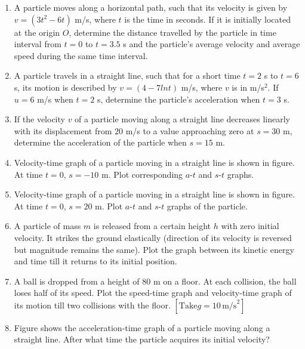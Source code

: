 \documentclass{article}
\begin{document}
\begin{enumerate}
\item A particle moves along a horizontal path, such that its velocity is given by \( v = (3t^2 - 6t) \) m/s, where \( t \) is the time in seconds. If it is initially located at the origin \( O \), determine the distance travelled by the particle in time interval from \( t = 0 \) to \( t = 3.5 \) s and the particle’s average velocity and average speed during the same time interval.

\item A particle travels in a straight line, such that for a short time \( t = 2 \) s to \( t = 6 \) s, its motion is described by \( v = (4 - 7 ln t) \) m/s, where \( v \) is in m/s\(^2\). If \( u = 6 \) m/s when \( t = 2 \) s, determine the particle’s acceleration when \( t = 3 \) s.

\item If the velocity \( v \) of a particle moving along a straight line decreases linearly with its displacement from \( 20 \) m/s to a value approaching zero at \( s = 30 \) m, determine the acceleration of the particle when \( s = 15 \) m.

\item Velocity-time graph of a particle moving in a straight line is shown in figure. At time \( t = 0 \), \( s = - 10 \) m. Plot corresponding \( a \)-\( t \) and \( s \)-\( t \) graphs.

\begin{center}
\end{center}

\item Velocity-time graph of a particle moving in a straight line is shown in figure. At time \( t = 0 \), \( s = 20 \) m. Plot \( a \)-\( t \) and \( s \)-\( t \) graphs of the particle.

\begin{center}
\end{center}


    \item A particle of mass \( m \) is released from a certain height \( h \) with zero initial velocity. It strikes the ground elastically (direction of its velocity is reversed but magnitude remains the same). Plot the graph between its kinetic energy and time till it returns to its initial position.
    \item A ball is dropped from a height of 80 m on a floor. At each collision, the ball loses half of its speed. Plot the speed-time graph and velocity-time graph of its motion till two collisions with the floor. \([ \text{Take} g = 10 \, \text{m/s}^2 ]\)
    \item Figure shows the acceleration-time graph of a particle moving along a straight line. After what time the particle acquires its initial velocity?


\end{enumerate}
\end{document}
